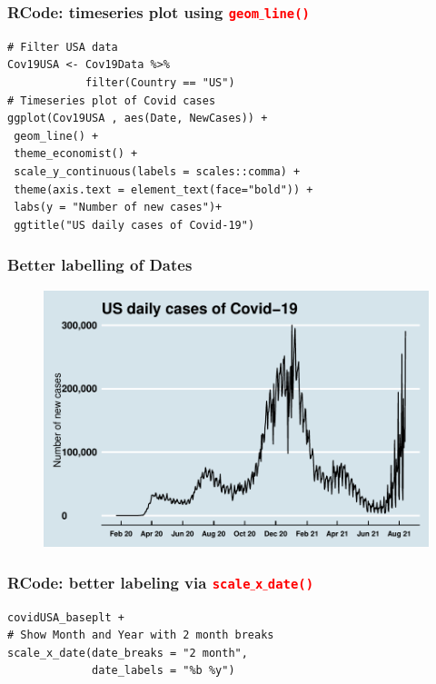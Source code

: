 \documentclass{beamer}
\begin{document}
\begin{frame}[fragile]\frametitle{RCode: timeseries plot using \texttt{\textcolor{red}{geom$\_$line()}}}
\begin{lstlisting}
# Filter USA data
Cov19USA <- Cov19Data %>% 
            filter(Country == "US")
# Timeseries plot of Covid cases
ggplot(Cov19USA , aes(Date, NewCases)) +
 geom_line() + 
 theme_economist() +
 scale_y_continuous(labels = scales::comma) +
 theme(axis.text = element_text(face="bold")) +
 labs(y = "Number of new cases")+
 ggtitle("US daily cases of Covid-19")
\end{lstlisting}
\end{frame}

\begin{frame}\frametitle{Better labelling of Dates}
\begin{figure}
\includegraphics[width=0.99\linewidth]{PlotsLec4/Covid19_US_2}
\end{figure}
\end{frame}

\begin{frame}[fragile]\frametitle{RCode: better labeling via \texttt{\textcolor{red}{scale$\_$x$\_$date()}}}
\begin{lstlisting}
covidUSA_baseplt +
# Show Month and Year with 2 month breaks
scale_x_date(date_breaks = "2 month",
             date_labels = "%b %y") 
\end{lstlisting}
\end{frame}
\end{document}
